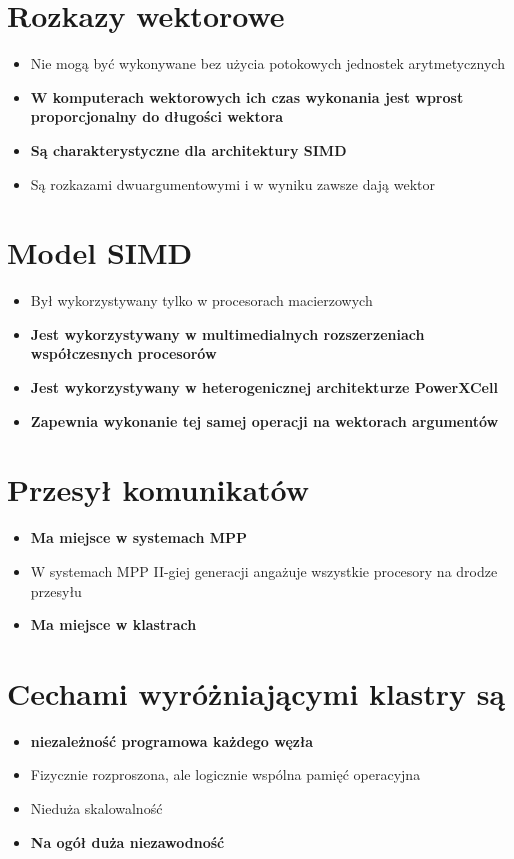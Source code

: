 \documentclass[a4paper,twoside]{article}
\begin{document}
\section{Rozkazy wektorowe}
	\begin{itemize}
    \item Nie mogą być wykonywane bez użycia potokowych jednostek arytmetycznych
    \item \textbf{W komputerach wektorowych ich czas wykonania jest wprost proporcjonalny do długości wektora}
    \item \textbf{Są charakterystyczne dla architektury SIMD}
    \item Są rozkazami dwuargumentowymi i w wyniku zawsze dają wektor
    \end{itemize}

\section{Model SIMD}
	\begin{itemize}
    \item Był wykorzystywany tylko w procesorach macierzowych
    \item \textbf{Jest wykorzystywany w multimedialnych rozszerzeniach współczesnych procesorów}
    \item \textbf{Jest wykorzystywany w heterogenicznej architekturze PowerXCell}
    \item \textbf{Zapewnia wykonanie tej samej operacji na wektorach argumentów}
    \end{itemize}

\section{Przesył komunikatów}
	\begin{itemize}
    \item \textbf{Ma miejsce w systemach MPP}
    \item W systemach MPP II-giej generacji angażuje wszystkie procesory na drodze przesyłu
    \item \textbf{Ma miejsce w klastrach}
    \end{itemize}

\section{Cechami wyróżniającymi klastry są}
	\begin{itemize}
    \item \textbf{niezależność programowa każdego węzła}
    \item Fizycznie rozproszona, ale logicznie wspólna pamięć operacyjna
    \item Nieduża skalowalność
    \item \textbf{Na ogół duża niezawodność}
    \end{itemize}
\end{document}
